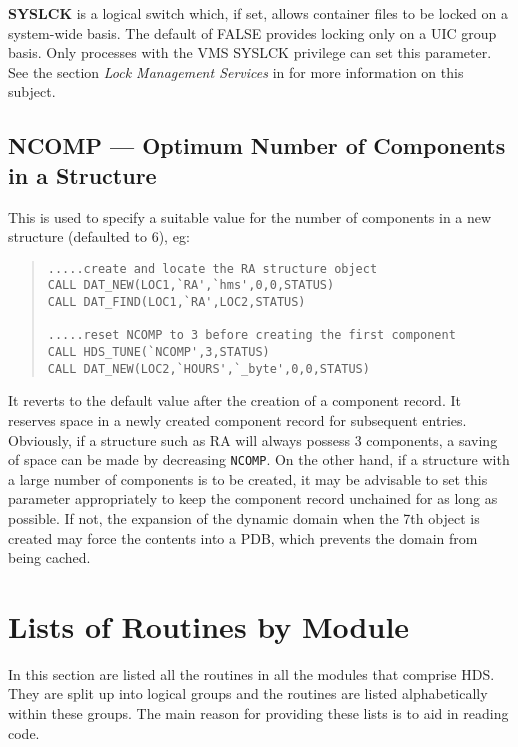 {\bf SYSLCK} is a logical switch which, if set, allows container files to be
locked on a system-wide basis. The default of FALSE provides locking only on a
UIC group basis. Only processes with the VMS SYSLCK privilege can set this
parameter. See the section {\em Lock Management Services} in
\cite{system_services_reference} for more information on this subject. 

\subsection {NCOMP --- Optimum Number of Components in a Structure}

This is used to specify a suitable value for the number of components in a new
structure (defaulted to 6), eg:

\begin {quote}
\begin {verbatim}
.....create and locate the RA structure object
CALL DAT_NEW(LOC1,`RA',`hms',0,0,STATUS)
CALL DAT_FIND(LOC1,`RA',LOC2,STATUS)

.....reset NCOMP to 3 before creating the first component
CALL HDS_TUNE(`NCOMP',3,STATUS)
CALL DAT_NEW(LOC2,`HOURS',`_byte',0,0,STATUS)
\end{verbatim}
\end {quote}

It reverts to the default value after the creation of a component record. It
reserves space in a newly created component record for subsequent entries.
Obviously, if a structure such as RA will always possess 3 components, a saving
of space can be made by decreasing {\tt NCOMP}. On the other hand, if a
structure with a large number of components is to be created, it may be
advisable to set this parameter appropriately to keep the component record
unchained for as long as possible. If not, the expansion of the dynamic domain
when the 7th object is created may force the contents into a PDB, which
prevents the domain from being cached. 

\appendix

\clearpage
\section {Lists of Routines by Module}
\label {routine_lists}

In this section are listed all the routines in all the modules that comprise
HDS. They are split up into logical groups and the routines are listed
alphabetically within these groups. The main reason for providing these lists
is to aid in reading code.

